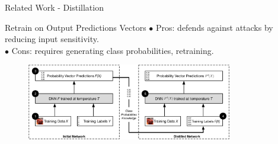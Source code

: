 \documentclass{beamer}
\begin{document}
\begin{frame}{Related Work - Distillation}

    \begin{block}{Retrain on Output Predictions Vectors}
        $\bullet$ Pros: defends against attacks by reducing input sensitivity.\\
        $\bullet$ Cons: requires generating class probabilities, retraining.
    \end{block}

    
   \begin{figure} 
       \includegraphics[width=0.8\textwidth]{images/Related-Work/distillation.png}
       \caption*{\cite{Papernot2016DistillationAA} }
   \end{figure}
    
\end{frame}
\end{document}
